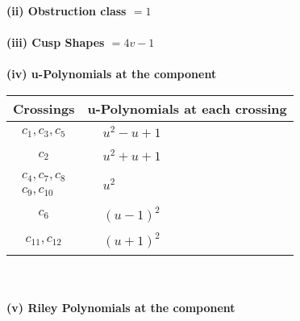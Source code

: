 \documentclass[1p]{elsarticle_modified}
\theoremstyle{definition}
\begin{document}
\flushleft \textbf{(ii) Obstruction class $= 1$}\\~\\
\flushleft \textbf{(iii) Cusp Shapes $= 4 v-1$}\\~\\
\newpage\renewcommand{\arraystretch}{1}
\flushleft \textbf{(iv) u-Polynomials at the component}\newline \\
\begin{tabular}{m{50pt}|m{274pt}}
Crossings & \hspace{64pt}u-Polynomials at each crossing \\
\hline $$\begin{aligned}c_{1},c_{3},c_{5}\end{aligned}$$&$\begin{aligned}
&u^2- u+1
\end{aligned}$\\
\hline $$\begin{aligned}c_{2}\end{aligned}$$&$\begin{aligned}
&u^2+u+1
\end{aligned}$\\
\hline $$\begin{aligned}c_{4},c_{7},c_{8}\\c_{9},c_{10}\end{aligned}$$&$\begin{aligned}
&u^2
\end{aligned}$\\
\hline $$\begin{aligned}c_{6}\end{aligned}$$&$\begin{aligned}
&(u-1)^2
\end{aligned}$\\
\hline $$\begin{aligned}c_{11},c_{12}\end{aligned}$$&$\begin{aligned}
&(u+1)^2
\end{aligned}$\\
\hline
\end{tabular}\\~\\
\newpage\renewcommand{\arraystretch}{1}
\flushleft \textbf{(v) Riley Polynomials at the component}\newline \\
\end{document}
